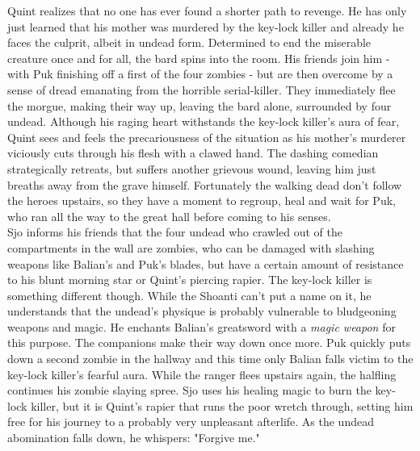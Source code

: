 Quint realizes that no one has ever found a shorter path to revenge. He has only just learned that his mother was murdered by the key-lock killer and already he faces the culprit, albeit in undead form. Determined to end the miserable creature once and for all, the bard spins into the room. His friends join him - with Puk finishing off a first of the four zombies - but are then overcome by a sense of dread emanating from the horrible serial-killer. They immediately flee the morgue, making their way up, leaving the bard alone, surrounded by four undead. Although his raging heart withstands the key-lock killer's aura of fear, Quint sees and feels the precariousness of the situation as his mother's murderer viciously cuts through his flesh with a clawed hand. The dashing comedian strategically retreats, but suffers another grievous wound, leaving him just breaths away from the grave himself. Fortunately the walking dead don't follow the heroes upstairs, so they have a moment to regroup, heal and wait for Puk, who ran all the way to the great hall before coming to his senses.\\

Sjo informs his friends that the four undead who crawled out of the compartments in the wall are zombies, who can be damaged with slashing weapons like Balian's and Puk's blades, but have a certain amount of resistance to his blunt morning star or Quint's piercing rapier. The key-lock killer is something different though. While the Shoanti can't put a name on it, he understands that the undead's physique is probably vulnerable to bludgeoning weapons and magic. He enchants Balian's greatsword with a {\itshape magic weapon} for this purpose. The companions make their way down once more. Puk quickly puts down a second zombie in the hallway and this time only Balian falls victim to the key-lock killer's fearful aura. While the ranger flees upstairs again, the halfling continues his zombie slaying spree. Sjo uses his healing magic to burn the key-lock killer, but it is Quint's rapier that runs the poor wretch through, setting him free for his journey to a probably very unpleasant afterlife. As the undead abomination falls down, he whispers: "Forgive me."\\

